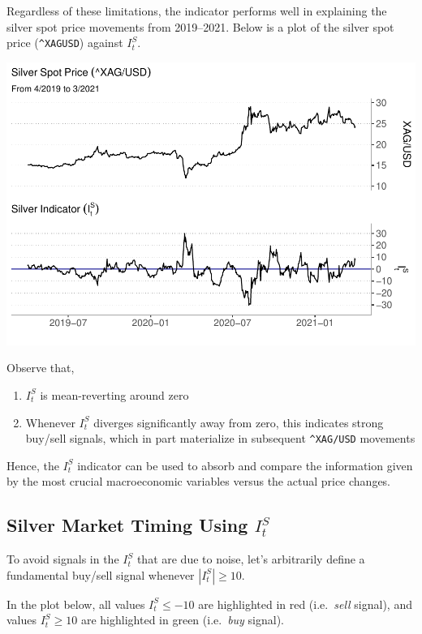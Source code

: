 \documentclass[
  12pt,
]{article}
\providecommand{\tightlist}{%
  \setlength{\itemsep}{0pt}\setlength{\parskip}{0pt}}
\begin{document}
Regardless of these limitations, the indicator performs well in
explaining the silver spot price movements from 2019--2021. Below is a
plot of the silver spot price (\texttt{\^{}XAGUSD}) against \(I^S_t\).

\includegraphics{silver-market-timing_files/figure-latex/silver-indicator-1.pdf}

Observe that,

\begin{enumerate}
\def\labelenumi{\arabic{enumi}.}
\tightlist
\item
  \(I^S_t\) is mean-reverting around zero
\item
  Whenever \(I^S_t\) diverges significantly away from zero, this
  indicates strong buy/sell signals, which in part materialize in
  subsequent \texttt{\^{}XAG/USD} movements
\end{enumerate}

Hence, the \(I^S_t\) indicator can be used to absorb and compare the
information given by the most crucial macroeconomic variables versus the
actual price changes.

\hypertarget{silver-market-timing-using-is_t}{%
\subsection{\texorpdfstring{Silver Market Timing Using
\(I^S_t\)}{Silver Market Timing Using I\^{}S\_t}}\label{silver-market-timing-using-is_t}}

To avoid signals in the \(I^S_t\) that are due to noise, let's
arbitrarily define a fundamental buy/sell signal whenever
\(|I^S_t| \ge 10\).

In the plot below, all values \(I^S_t \leq -10\) are highlighted in red
(i.e.~\emph{sell} signal), and values \(I^S_t \geq 10\) are highlighted
in green (i.e.~\emph{buy} signal).
\end{document}
